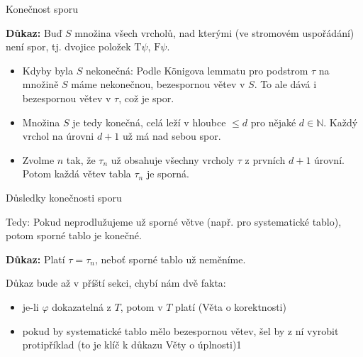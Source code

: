 \documentclass{beamer}
\begin{document}
\begin{frame}{Konečnost sporu}


    \pause
    \textbf{Důkaz:} 
    Buď $S$ množina všech vrcholů, nad kterými (ve stromovém uspořádání) není spor, tj. dvojice položek $\mathrm{T}\psi$, $\mathrm{F}\psi$.\pause

    \begin{itemize}[<+->]
        \item \alert{Kdyby byla $S$ nekonečná:} Podle Königova lemmatu pro podstrom $\tau$ na množině $S$ máme nekonečnou, bezespornou větev v $S$. To ale dává i \alert{bezespornou větev v $\tau$}, což je spor. 
    
        \item \alert{Množina $S$ je tedy konečná,} celá leží v hloubce $\leq d$ pro nějaké $d\in\mathbb N$. Každý vrchol \alert{na úrovni $d+1$ už má nad sebou spor}. 
        
        \item Zvolme $n$ tak, že $\tau_n$ už obsahuje všechny vrcholy $\tau$ z prvních $d+1$ úrovní. Potom každá větev tabla $\tau_n$ je sporná.\hfill\qedsymbol
    \end{itemize}    

\end{frame}


\begin{frame}{Důsledky konečnosti sporu}
    
    Tedy: Pokud neprodlužujeme už sporné větve (např. pro systematické tablo), potom sporné tablo je konečné.
    \medskip

    \pause

    \pause
    \textbf{Důkaz:} 
    Platí $\tau=\tau_n$, neboť sporné tablo už neměníme.\hfill\qedsymbol   

    \bigskip

    \pause

    \pause
    Důkaz bude až v příští sekci, chybí nám dvě fakta:\pause
    \begin{itemize}
        \item je-li $\varphi$ dokazatelná z $T$, potom v $T$ platí (Věta o korektnosti)\pause
        \item pokud by systematické tablo mělo bezespornou větev, šel by z ní vyrobit protipříklad (to je klíč k důkazu Věty o úplnosti)1
    \end{itemize}

\end{frame}
\end{document}
